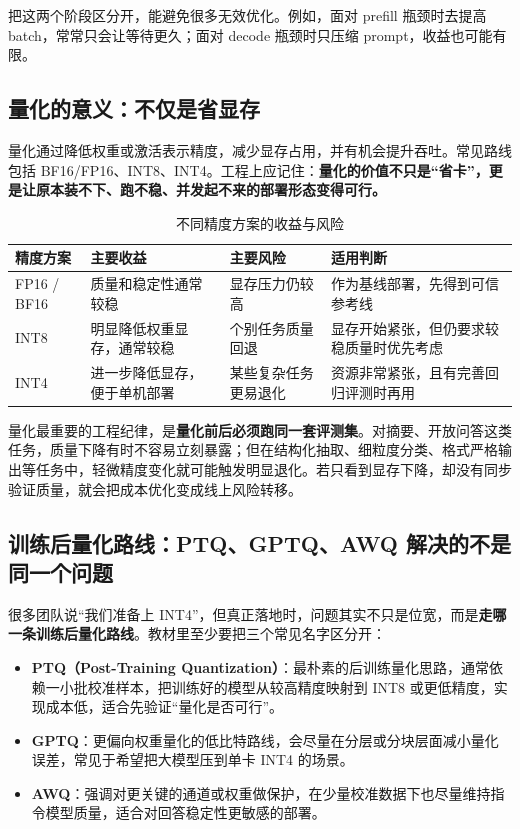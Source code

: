 把这两个阶段区分开，能避免很多无效优化。例如，面对 prefill 瓶颈时去提高 batch，常常只会让等待更久；面对 decode 瓶颈时只压缩 prompt，收益也可能有限。

\subsection{量化的意义：不仅是省显存}
量化通过降低权重或激活表示精度，减少显存占用，并有机会提升吞吐。常见路线包括 BF16/FP16、INT8、INT4。工程上应记住：\textbf{量化的价值不只是“省卡”，更是让原本装不下、跑不稳、并发起不来的部署形态变得可行。}

\begin{table}[H]
\centering
\small
\begin{tabularx}{\textwidth}{>{\raggedright\arraybackslash}p{2.2cm}>{\raggedright\arraybackslash}p{2.6cm}>{\raggedright\arraybackslash}p{3cm}>{\raggedright\arraybackslash}X}
\toprule
\textbf{精度方案} & \textbf{主要收益} & \textbf{主要风险} & \textbf{适用判断} \\
\midrule
FP16 / BF16 & 质量和稳定性通常较稳 & 显存压力仍较高 & 作为基线部署，先得到可信参考线 \\
INT8 & 明显降低权重显存，通常较稳 & 个别任务质量回退 & 显存开始紧张，但仍要求较稳质量时优先考虑 \\
INT4 & 进一步降低显存，便于单机部署 & 某些复杂任务更易退化 & 资源非常紧张，且有完善回归评测时再用 \\
\bottomrule
\end{tabularx}
\caption{不同精度方案的收益与风险}
\label{tab:precision-tradeoff}
\end{table}

量化最重要的工程纪律，是\textbf{量化前后必须跑同一套评测集}。对摘要、开放问答这类任务，质量下降有时不容易立刻暴露；但在结构化抽取、细粒度分类、格式严格输出等任务中，轻微精度变化就可能触发明显退化。若只看到显存下降，却没有同步验证质量，就会把成本优化变成线上风险转移。

\subsection{训练后量化路线：PTQ、GPTQ、AWQ 解决的不是同一个问题}
很多团队说“我们准备上 INT4”，但真正落地时，问题其实不只是位宽，而是\textbf{走哪一条训练后量化路线}。教材里至少要把三个常见名字区分开：
\begin{itemize}
  \item \textbf{PTQ（Post-Training Quantization）}：最朴素的后训练量化思路，通常依赖一小批校准样本，把训练好的模型从较高精度映射到 INT8 或更低精度，实现成本低，适合先验证“量化是否可行”。
  \item \textbf{GPTQ}：更偏向权重量化的低比特路线，会尽量在分层或分块层面减小量化误差，常见于希望把大模型压到单卡 INT4 的场景。
  \item \textbf{AWQ}：强调对更关键的通道或权重做保护，在少量校准数据下也尽量维持指令模型质量，适合对回答稳定性更敏感的部署。
\end{itemize}

